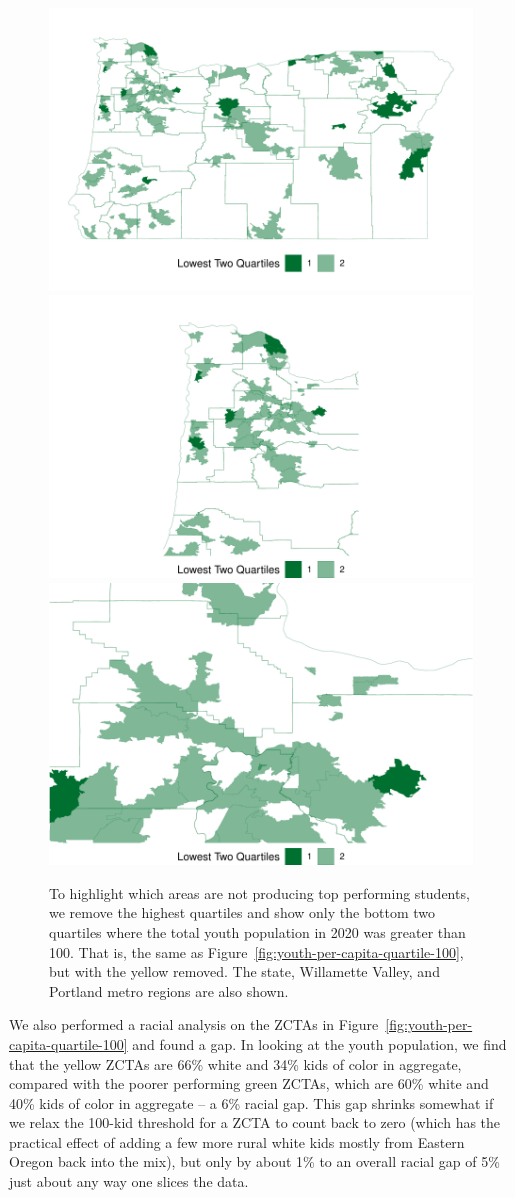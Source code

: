 \documentclass[10pt]{article}
\begin{document}
\begin{figure}[H]
	\centering
	\includegraphics[width=\linewidth]{../visualizations/lowest-two-quartiles}
	\includegraphics[width=0.55\linewidth]{../visualizations/lowest-two-williammette}
	\includegraphics[width=0.4\linewidth]{../visualizations/lowest-two-pdx}
	\caption{
		To highlight which areas are not producing top performing students, we remove the highest quartiles and show only the bottom two quartiles where the total youth population in 2020 was greater than 100. That is, the same as Figure~\ref{fig:youth-per-capita-quartile-100}, but with the yellow removed. The state, Willamette Valley, and Portland metro regions are also shown.}
	\label{fig:lowest-two-quartiles}
\end{figure}

\newpage

We also performed a racial analysis on the ZCTAs in Figure~\ref{fig:youth-per-capita-quartile-100} and found a gap. In looking at the youth population, we find that the yellow ZCTAs are 66\% white and 34\% kids of color in aggregate, compared with the poorer performing green ZCTAs, which are 60\% white and 40\% kids of color in aggregate -- a 6\% racial gap. This gap shrinks somewhat if we relax the 100-kid threshold for a ZCTA to count back to zero (which has the practical effect of adding a few more rural white kids mostly from Eastern Oregon back into the mix), but only by about 1\% to an overall racial gap of 5\% just about any way one slices the data.
\end{document}
